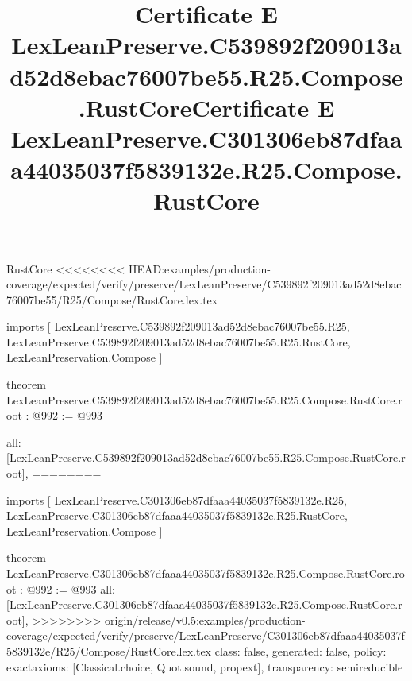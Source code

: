 \begin{lexlean}{RustCore}
<<<<<<<< HEAD:examples/production-coverage/expected/verify/preserve/LexLeanPreserve/C539892f209013ad52d8ebac76007be55/R25/Compose/RustCore.lex.tex
\title{Certificate E LexLeanPreserve.C539892f209013ad52d8ebac76007be55.R25.Compose.RustCore}
\begin{coremodule}
imports [
  LexLeanPreserve.C539892f209013ad52d8ebac76007be55.R25,
  LexLeanPreserve.C539892f209013ad52d8ebac76007be55.R25.RustCore,
  LexLeanPreservation.Compose
]

theorem LexLeanPreserve.C539892f209013ad52d8ebac76007be55.R25.Compose.RustCore.root : @992 := @993 {
  all: [LexLeanPreserve.C539892f209013ad52d8ebac76007be55.R25.Compose.RustCore.root],
========
\title{Certificate E LexLeanPreserve.C301306eb87dfaaa44035037f5839132e.R25.Compose.RustCore}
\begin{coremodule}
imports [
  LexLeanPreserve.C301306eb87dfaaa44035037f5839132e.R25,
  LexLeanPreserve.C301306eb87dfaaa44035037f5839132e.R25.RustCore,
  LexLeanPreservation.Compose
]

theorem LexLeanPreserve.C301306eb87dfaaa44035037f5839132e.R25.Compose.RustCore.root : @992 := @993 {
  all: [LexLeanPreserve.C301306eb87dfaaa44035037f5839132e.R25.Compose.RustCore.root],
>>>>>>>> origin/release/v0.5:examples/production-coverage/expected/verify/preserve/LexLeanPreserve/C301306eb87dfaaa44035037f5839132e/R25/Compose/RustCore.lex.tex
  class: false,
  generated: false,
  policy: exact{axioms: [Classical.choice, Quot.sound, propext]},
  transparency: semireducible
}


\end{coremodule}}
\end{coremodule}
\end{lexlean}
